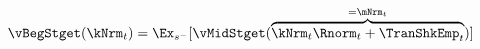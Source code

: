   \begin{equation}\begin{gathered}\begin{aligned}
\vBegStget(\kNrm_{\stge}) & = \Ex_{\BegStget}[\vMidStget(\overbrace{\kNrm_{\stge} \Rnorm_{\stge} + \TranShkEmp_{\stge}}^{=\mNrm_{\stge}})]  \label{eq:vBegStget}
      \end{aligned}\end{gathered}\end{equation}

